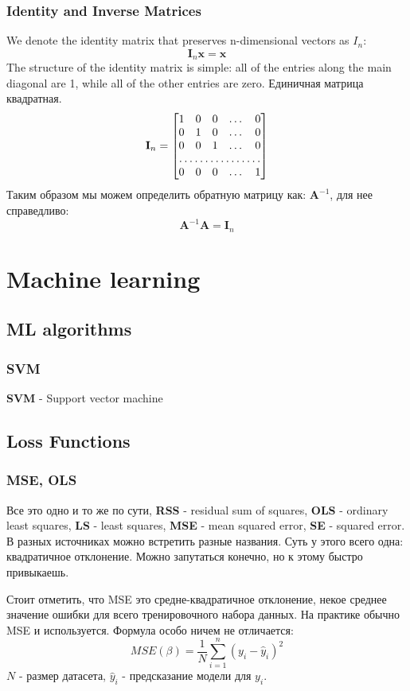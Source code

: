 \documentclass{book}
\begin{document}
\section{Identity and Inverse Matrices}
We denote the identity matrix that preserves n-dimensional vectors as $I_n$:$$\mathbf{I}_n\mathbf{x}=\mathbf{x}$$The structure of the identity matrix is simple: all of the entries along the main
diagonal are 1, while all of the other entries are zero.
Единичная матрица квадратная.
\[
\mathbf{I}_n=
\begin{bmatrix}
    1       & 0 & 0 & \dots & 0 \\
    0       & 1 & 0 & \dots & 0 \\
    0       & 0 & 1 & \dots & 0 \\
    \hdotsfor{5} \\
    0       & 0 & 0 & \dots & 1
\end{bmatrix}
\]
Таким образом мы можем определить обратную матрицу как: $\mathbf{A}^{-1}$, для нее справедливо:$$\mathbf{A}^{-1}\mathbf{A} = \mathbf{I}_n$$
\label{Identity_and_Inverse_Matrices}
\part{Machine learning}
\chapter{ML algorithms}
\section{SVM}
\textbf{SVM} - Support vector machine
\chapter{Loss Functions}
\section{MSE, OLS}
Все это одно и то же по сути, \textbf{RSS} - residual sum of squares, \textbf{OLS} - ordinary least squares, \textbf{LS} - least  squares, \textbf{MSE} - mean squared error, \textbf{SE} - squared error. В разных источниках можно встретить разные названия. Суть у этого всего одна: квадратичное отклонение. Можно запутаться конечно, но к этому быстро привыкаешь.

Стоит отметить, что MSE это средне-квадратичное отклонение, некое среднее значение ошибки для всего тренировочного набора данных. На практике обычно MSE и используется. Формула особо ничем не отличается:$$MSE(\beta)=\frac{1}{N}\sum_{i=1}^n(y_i-\hat{y}_i)^2$$$N$ - размер датасета, $\hat{y}_i$ - предсказание модели для $y_i$.
\label{loss:LS}
\end{document}
